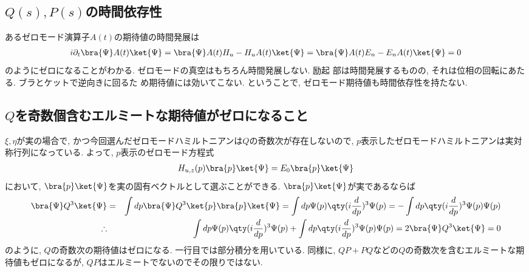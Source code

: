 \documentclass[10.5pt,a4paper]{jreport}
\begin{document}
\subsection{$Q(s), P(s)$の時間依存性}
あるゼロモード演算子$A(t)$の期待値の時間発展は
\begin{eqnarray}
  i\partial_t \bra{\Psi} A(t) \ket{\Psi}
  = \bra{\Psi} A(t) H_u - H_u A(t) \ket{\Psi}
  = \bra{\Psi} A(t) E_n - E_n A(t) \ket{\Psi}
  = 0
\end{eqnarray}
のようにゼロになることがわかる. ゼロモードの真空はもちろん時間発展しない. 励起
部は時間発展するものの, それは位相の回転にあたる.  ブラとケットで逆向きに回るた
め期待値には効いてこない. ということで, ゼロモード期待値も時間依存性を持たない. 

\subsection{$Q$を奇数個含むエルミートな期待値がゼロになること}
$\xi, \eta$が実の場合で, かつ今回選んだゼロモードハミルトニアンは$Q$の奇数次が存在しないので, $p$表示したゼロモードハミルトニアンは実対称行列になっている. よって, $p$表示のゼロモード方程式
\begin{eqnarray}
  H_{u, z}(p)\bra{p}\ket{\Psi} = E_0\bra{p}\ket{\Psi}
\end{eqnarray}
において, $\bra{p}\ket{\Psi}$を実の固有ベクトルとして選ぶことができる. $\bra{p}\ket{\Psi}$が実であるならば
\begin{eqnarray}
  \nonumber  \bra{\Psi}Q^3\ket{\Psi} &=& \int dp \bra{\Psi}Q^3\ket{p}\bra{p}\ket{\Psi} = \int dp \Psi(p)\qty(i\frac{d}{dp})^3\Psi(p)= -\int dp \qty(i\frac{d}{dp})^3\Psi(p)\Psi(p)\\
  \therefore &&\int dp \Psi(p)\qty(i\frac{d}{dp})^3\Psi(p) + \int dp \qty(i\frac{d}{dp})^3\Psi(p)\Psi(p) = 2\bra{\Psi}Q^3\ket{\Psi} = 0
\end{eqnarray}
のように, $Q$の奇数次の期待値はゼロになる. 一行目では部分積分を用いている. 同様に, $QP + PQ$などの$Q$の奇数次を含むエルミートな期待値もゼロになるが, $QP$はエルミートでないのでその限りではない. 
\end{document}

